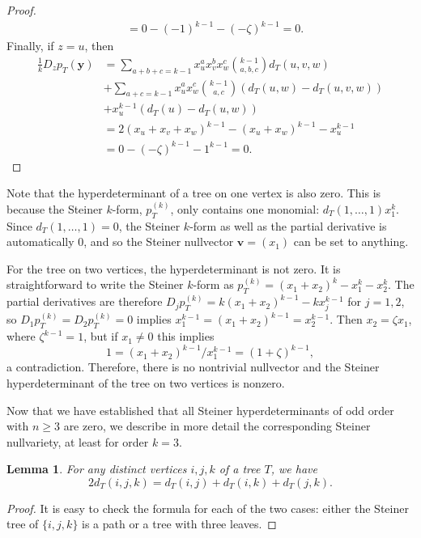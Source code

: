 \documentclass{article}
\newtheorem{lemma}[theorem]{Lemma}
\begin{document}
\begin{proof}
\begin{align*}
        &= 0 - (-1)^{k-1} - (-\zeta)^{k-1} = 0.
    \end{align*}
    Finally, if $z=u$, then
    \begin{align*}
        \frac{1}{k} D_z p_T (\mathbf{y}) &= \sum_{a+b+c=k-1} x_u^a x_v^b x_w^c \binom{k-1}{a,b,c} d_T(u,v,w) \\
        & + \sum_{a+c=k-1} x_u^a x_w^c \binom{k-1}{a,c} (d_T(u,w)-d_T(u,v,w)) \\
        & + x_u^{k-1} (d_T(u)-d_T(u,w))\\
        &= 2 (x_u+x_v+x_w)^{k-1} - (x_u+x_w)^{k-1} - x_u^{k-1} \\
        &= 0 - (-\zeta)^{k-1} - 1^{k-1} = 0.
    \end{align*}
\end{proof}

Note that the hyperdeterminant of a tree on one vertex is also zero. This is because the Steiner $k$-form, $p_T^{(k)}$, only contains one monomial: $d_T(1,\ldots,1)x_1^k$. Since $d_T(1,\ldots,1) = 0$, the Steiner $k$-form as well as the partial derivative is automatically $0$, and so the Steiner nullvector $\mathbf{v} = (x_1)$ can be set to anything. 

For the tree on two vertices, the hyperdeterminant is not zero. It is straightforward to write the Steiner $k$-form as $p_T^{(k)} = (x_1+x_2)^k - x_1^k - x_2^k$. The partial derivatives are therefore $D_j p_T^{(k)} = k(x_1+x_2)^{k-1}-kx_j^{k-1}$ for $j=1,2$, so $D_1p_T^{(k)}=D_2p_T^{(k)}=0$ implies $x_1^{k-1}=(x_1+x_2)^{k-1}=x_2^{k-1}$.  Then $x_2 = \zeta x_1$, where $\zeta^{k-1} = 1$, but if $x_1 \neq 0$ this implies
$$
1 = (x_1+x_2)^{k-1}/x_1^{k-1} = (1 + \zeta)^{k-1},
$$
a contradiction.  Therefore, there is no nontrivial nullvector and the Steiner hyperdeterminant of the tree on two vertices is nonzero.  

Now that we have established that all Steiner hyperdeterminants of odd order with $n \geq 3$ are zero, we describe in more detail the corresponding Steiner nullvariety, at least for order $k=3$.

\begin{lemma} \label{lem:pathorY} For any distinct vertices $i,j,k$ of a tree $T$, we have
$$
2d_T(i,j,k) = d_T(i,j)+d_T(i,k)+d_T(j,k).
$$
\end{lemma}
\begin{proof}
    It is easy to check the formula for each of the two cases: either the Steiner tree of $\{i,j,k\}$ is a path or a tree with three leaves.
\end{proof}
\end{document}
